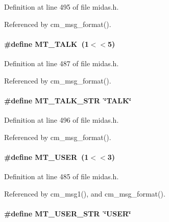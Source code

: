 Definition at line 495 of file midas.h.

Referenced by cm\_\-msg\_\-format().
\paragraph[{MT\_\-TALK}]{\setlength{\rightskip}{0pt plus 5cm}\#define MT\_\-TALK~(1$<$$<$5)}\hfill\label{group__mdefineh_ga7d9c4230376d6527c7c8cd810eeb3e86}

\begin{DoxyItemize}
\item 
\end{DoxyItemize}

Definition at line 487 of file midas.h.

Referenced by cm\_\-msg\_\-format().
\paragraph[{MT\_\-TALK\_\-STR}]{\setlength{\rightskip}{0pt plus 5cm}\#define MT\_\-TALK\_\-STR~\char`\"{}TALK\char`\"{}}\hfill\label{group__mdefineh_gab10443dc749d21df4bbf3bcddc97d5ae}


Definition at line 496 of file midas.h.

Referenced by cm\_\-msg\_\-format().
\paragraph[{MT\_\-USER}]{\setlength{\rightskip}{0pt plus 5cm}\#define MT\_\-USER~(1$<$$<$3)}\hfill\label{group__mdefineh_ga8e13ab6bdea106f548ecb162bdcd41a9}

\begin{DoxyItemize}
\item 
\end{DoxyItemize}

Definition at line 485 of file midas.h.

Referenced by cm\_\-msg1(), and cm\_\-msg\_\-format().
\paragraph[{MT\_\-USER\_\-STR}]{\setlength{\rightskip}{0pt plus 5cm}\#define MT\_\-USER\_\-STR~\char`\"{}USER\char`\"{}}\hfill\label{group__mdefineh_ga971b0b6ab0b87a3ea0175808d04192e4}


